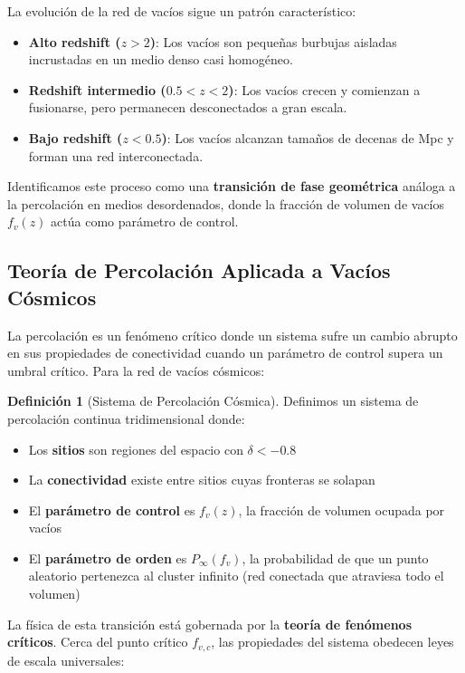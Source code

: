 \documentclass[12pt, a4paper]{article}
\theoremstyle{plain}
\theoremstyle{definition}
\newtheorem{definicion}{Definición}
\begin{document}
La evolución de la red de vacíos sigue un patrón característico:
\begin{itemize}
    \item \textbf{Alto redshift ($z > 2$)}: Los vacíos son pequeñas burbujas aisladas incrustadas en un medio denso casi homogéneo.
    \item \textbf{Redshift intermedio ($0.5 < z < 2$)}: Los vacíos crecen y comienzan a fusionarse, pero permanecen desconectados a gran escala.
    \item \textbf{Bajo redshift ($z < 0.5$)}: Los vacíos alcanzan tamaños de decenas de Mpc y forman una red interconectada.
\end{itemize}

Identificamos este proceso como una \textbf{transición de fase geométrica} análoga a la percolación en medios desordenados, donde la fracción de volumen de vacíos $f_v(z)$ actúa como parámetro de control.

\subsection{Teoría de Percolación Aplicada a Vacíos Cósmicos}

La percolación es un fenómeno crítico donde un sistema sufre un cambio abrupto en sus propiedades de conectividad cuando un parámetro de control supera un umbral crítico. Para la red de vacíos cósmicos:

\begin{definicion}[Sistema de Percolación Cósmica]
Definimos un sistema de percolación continua tridimensional donde:
\begin{itemize}
    \item Los \textbf{sitios} son regiones del espacio con $\delta < -0.8$
    \item La \textbf{conectividad} existe entre sitios cuyas fronteras se solapan
    \item El \textbf{parámetro de control} es $f_v(z)$, la fracción de volumen ocupada por vacíos
    \item El \textbf{parámetro de orden} es $P_\infty(f_v)$, la probabilidad de que un punto aleatorio pertenezca al cluster infinito (red conectada que atraviesa todo el volumen)
\end{itemize}
\end{definicion}

La física de esta transición está gobernada por la \textbf{teoría de fenómenos críticos}. Cerca del punto crítico $f_{v,c}$, las propiedades del sistema obedecen leyes de escala universales:
\end{document}
